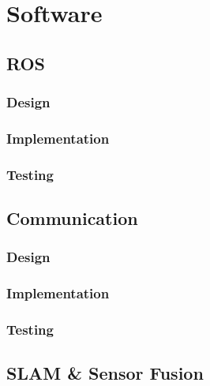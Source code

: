 
\chapter{Software}\label{software}




\section{ROS}\label{soft/ROS}

\subsection{Design}\label{soft/ROS/design}

\subsection{Implementation}\label{soft/ROS/impl}

\subsection{Testing}\label{soft/ROS/test}



\section{Communication}\label{soft/comms}

\subsection{Design}\label{soft/comms/design}

\subsection{Implementation}\label{soft/comms/impl}

\subsection{Testing}\label{soft/comms/test}




\section{SLAM \& Sensor Fusion}\label{soft/SLAM}

